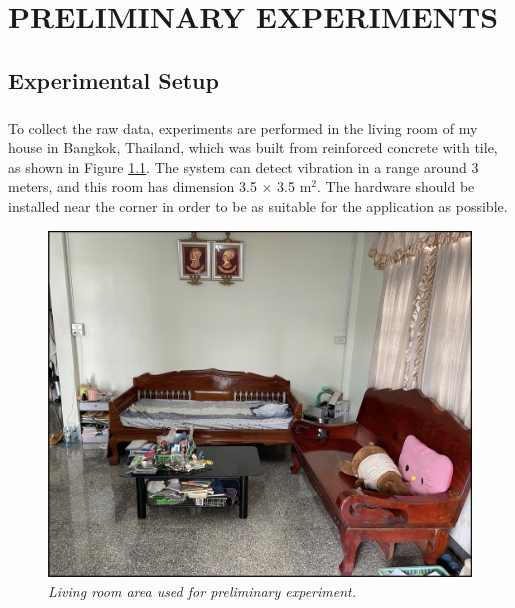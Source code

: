 \setlength{\parindent}{0in} 
\setlength{\parskip}{1em}
\setlength{\baselineskip}{1.6em}

\chapter{PRELIMINARY EXPERIMENTS}
\label{ch:results}


\section{Experimental Setup}
\paragraph{}
To collect the raw data, experiments are performed in the living room of my house in Bangkok, Thailand, which was built from reinforced concrete with tile, as shown in Figure \ref{fig:home}. The system can detect vibration in a range around 3 meters, and this room has dimension 3.5 $\times$ 3.5 $\text{m}^2$. The hardware should be installed near the corner in order to be as suitable for the application as possible.

\begin{figure}[H]
  \centering
  \caption[Living room area used for preliminary experiment.]{\emph{Living room area used for preliminary experiment.}}\label{fig:home}
  \includegraphics[scale = 0.15]{figures/home.jpg}  
\end{figure}

